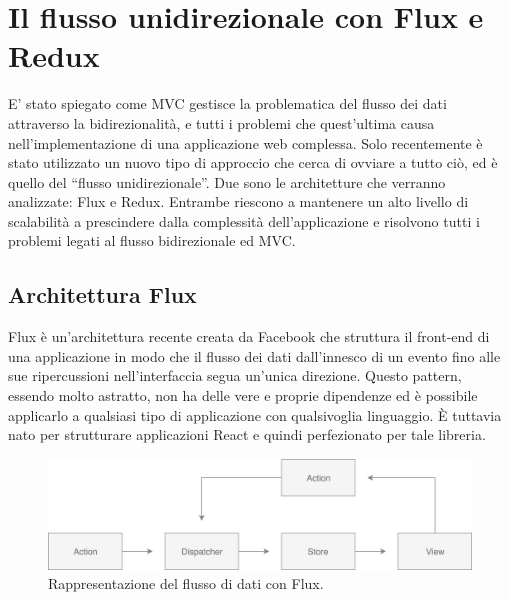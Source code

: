 \chapter{Il flusso unidirezionale con Flux e Redux}
E' stato spiegato come MVC gestisce la problematica del flusso dei dati attraverso la bidirezionalità, e tutti i problemi che quest'ultima causa nell'implementazione di una applicazione web complessa. Solo recentemente è stato utilizzato un nuovo tipo di approccio che cerca di ovviare a tutto ciò, ed è quello del “flusso unidirezionale”. Due sono le architetture che verranno analizzate: Flux e Redux. Entrambe riescono a mantenere un alto livello di scalabilità a prescindere dalla complessità dell'applicazione e risolvono tutti i problemi legati al flusso bidirezionale ed MVC.

\section{Architettura Flux}
\label{FluxArchitecture}
Flux è un'architettura recente creata da Facebook che struttura il front-end di una applicazione in modo che il flusso dei dati dall'innesco di un evento fino alle sue ripercussioni nell'interfaccia segua un'unica direzione.
Questo pattern, essendo molto astratto, non ha delle vere e proprie dipendenze ed è possibile applicarlo a qualsiasi tipo di applicazione con qualsivoglia linguaggio. È tuttavia nato per strutturare applicazioni React e quindi perfezionato per tale libreria.

\begin{figure}[h]
\centering
\vspace*{0.5cm} 
\includegraphics[width=14cm]{./images/FluxWorkflow}
\caption{Rappresentazione del flusso di dati con Flux.}
\label{FluxWorkflow}
\vspace*{0.5cm} 
\end{figure}

